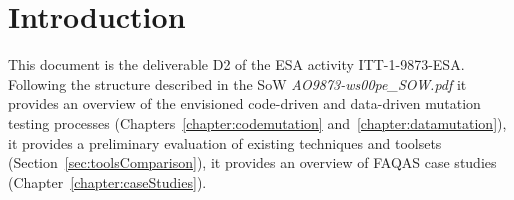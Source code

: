 
\chapter*{Introduction}
\label{sec:introduction}

This document is the deliverable D2 of the ESA activity ITT-1-9873-ESA. Following the structure described in the SoW \emph{AO9873-ws00pe\_SOW.pdf} it provides an overview of the envisioned code-driven and data-driven mutation testing processes (Chapters~\ref{chapter:codemutation} and~\ref{chapter:datamutation}), it provides a preliminary evaluation of existing techniques and toolsets (Section~\ref{sec:toolsComparison}), it provides an overview of FAQAS case studies (Chapter~\ref{chapter:caseStudies}).
 
